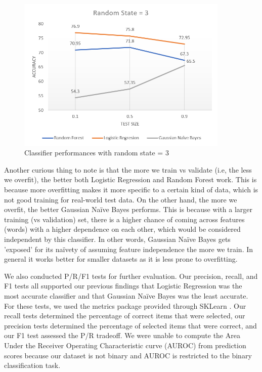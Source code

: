 \documentclass[]{IEEEtran}
\begin{document}
\begin{figure}[ht]
    \begin{minipage}{0.5\textwidth}
        \centering
        \includegraphics[width=0.9\textwidth]{RS3.png}
        \caption{Classifier performances with random state = 3 \label{rs3}}
    \end{minipage}\hfill
\end{figure}


Another curious thing to note is that the more we train vs validate (i.e, the less we overfit), the better both Logistic Regression and Random Forest work. This is because more overfitting makes it more specific to a certain kind of data, which is not good training for real-world test data. On the other hand, the more we overfit, the better Gaussian Na{\"i}ve Bayes performs. This is because with a larger training (vs validation) set, there is a higher chance of coming across features (words) with a higher dependence on each other, which would be considered independent by this classifier. In other words, Gaussian Na{\"i}ve Bayes gets 'exposed' for its na{\"i}vety of assuming feature independence the more we train. In general it works better for smaller datasets as it is less prone to overfitting.


We also conducted P/R/F1 tests for further evaluation. Our precision, recall, and F1 tests all supported our previous findings that Logistic Regression was the most accurate classifier and that Gaussian Na{\"i}ve Bayes was the least accurate. For these tests, we used the metrics package provided through SKLearn \cite{scikit-learn}. Our recall tests determined the percentage of correct items that were selected, our precision tests determined the percentage of selected items that were correct, and our F1 test assessed the P/R
tradeoff. We were unable to compute the Area Under the Receiver Operating Characteristic curve (AUROC) from prediction scores because our dataset is not binary and AUROC is restricted to the binary classification task.
\end{document}
